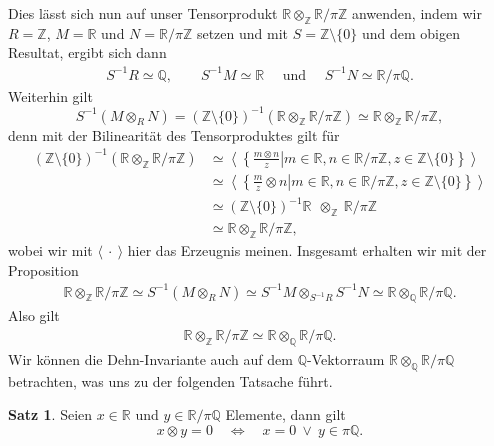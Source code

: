 \documentclass[11pt,titlepage]{article}
\newcommand{\setZ}{\mathbb{Z}}
\newcommand{\setQ}{\mathbb{Q}}
\newcommand{\setR}{\mathbb{R}}
\theoremstyle{definition}
\newtheorem{theorem}{Satz}[section]
\theoremstyle{remark}
\begin{document}
	Dies lässt sich nun auf unser Tensorprodukt 
	$\setR\otimes_{\setZ}\setR /\pi\setZ$ anwenden, indem wir $R=\setZ$, $M=\setR$ und $N=\setR /\pi\setZ$ setzen und mit 
	$S=\setZ\setminus\{0\}$ und dem obigen Resultat, ergibt sich 
	dann
	\begin{align*}
		S^{-1}R\simeq\setQ,\qquad S^{-1}M\simeq\setR
		\quad\text{ und }\quad S^{-1}N\simeq\setR /\pi\setQ.
	\end{align*}
	Weiterhin gilt
	\[S^{-1}(M\otimes_R N)=(\setZ\setminus\{0\})^{-1}(\setR\otimes_{\setZ}\setR/\pi\setZ)\simeq \setR\otimes_\setZ\setR/\pi\setZ,\]
	denn mit der Bilinearität des Tensorproduktes gilt für 
	\begin{align*}
		(\setZ\setminus\{0\})^{-1}(\setR\otimes_{\setZ}\setR /\pi\setZ)&\simeq
		\left.\left\langle \left\{\frac{m\otimes n}{z}\right\vert
		 m\in\setR,n\in\setR/\pi\setZ,z\in\setZ\setminus\{0\}\right\}\right\rangle \\
		 &\simeq \left.\left\langle \left\{\frac{m}{z}\otimes n\right\vert m\in\setR,n\in\setR/\pi\setZ,z\in\setZ\setminus\{0\}\right\}
		 \right\rangle \\
		 &\simeq (\setZ\setminus\{0\})^{-1}\setR\ \ \otimes_\setZ\  \setR/\pi\setZ \\
		 &\simeq \setR\otimes_\setZ \setR/\pi\setZ,
	\end{align*}
	wobei wir mit $\langle\ \cdot\ \rangle$ hier das Erzeugnis meinen.
	Insgesamt erhalten wir mit der Proposition
	\begin{align*}
		\setR\otimes_\setZ\setR/\pi\setZ\simeq S^{-1}(M\otimes_R N)\simeq S^{-1}M\otimes_{S^{-1}R}S^{-1}N\simeq\setR\otimes_\setQ\setR/\pi\setQ.
	\end{align*}
	Also gilt
	\begin{align}
		\setR\otimes_\setZ\setR/\pi\setZ\simeq\setR\otimes_\setQ\setR/\pi\setQ. \label{tensor=0}
	\end{align}
	Wir können die Dehn-Invariante auch auf dem $\setQ$-Vektorraum 
	$\setR\otimes_\setQ\setR/\pi\setQ$ betrachten, was uns zu der folgenden 
	Tatsache führt.
	
	\begin{theorem} \label{bem:dehn=0}
		Seien $x\in \setR$ und $y\in\setR/\pi\setQ$ Elemente, dann gilt
		\[ x\otimes y =0 \quad \Leftrightarrow \quad x=0 \ \lor\ y\in\pi\setQ.\]
	\end{theorem}
	
\end{document}
